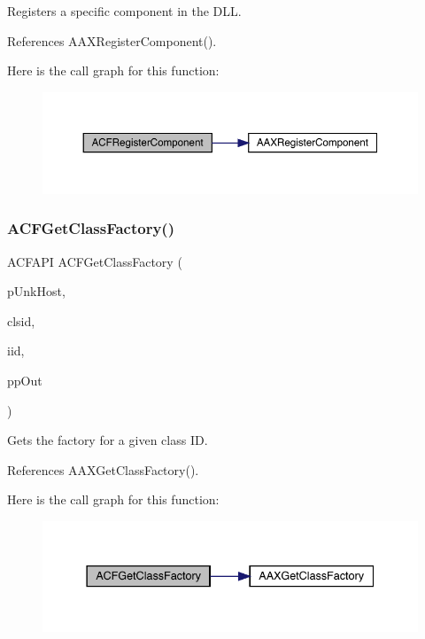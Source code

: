Registers a specific component in the D\+LL. 



References A\+A\+X\+Register\+Component().

Here is the call graph for this function\+:
\nopagebreak
\begin{figure}[H]
\begin{center}
\leavevmode
\includegraphics[width=350pt]{a00500_a68950ea83fea9b46b8f3fef409355b71_cgraph}
\end{center}
\end{figure}
\mbox{\label{a00500_a63cbe0222beee199dad20c26e79ebeaa}} 
\subsubsection{\texorpdfstring{ACFGetClassFactory()}{ACFGetClassFactory()}}
{\footnotesize\ttfamily A\+C\+F\+A\+PI A\+C\+F\+Get\+Class\+Factory (\begin{DoxyParamCaption}\item[{\mbox{\hyperlink{a01409}{I\+A\+C\+F\+Unknown}} $\ast$}]{p\+Unk\+Host,  }\item[{const acf\+C\+L\+S\+ID \&}]{clsid,  }\item[{const \mbox{\hyperlink{a00269_a59df0b41744eee7a066787aaedf97f67}{acf\+I\+ID}} \&}]{iid,  }\item[{void $\ast$$\ast$}]{pp\+Out }\end{DoxyParamCaption})}



Gets the factory for a given class ID. 



References A\+A\+X\+Get\+Class\+Factory().

Here is the call graph for this function\+:
\nopagebreak
\begin{figure}[H]
\begin{center}
\leavevmode
\includegraphics[width=337pt]{a00500_a63cbe0222beee199dad20c26e79ebeaa_cgraph}
\end{center}
\end{figure}
\mbox{\label{a00500_ae5327dbd8fd750c78eca3892831f4ad8}} 
